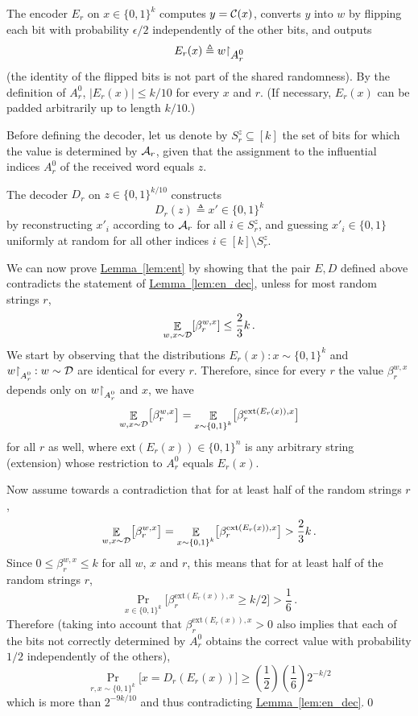 \documentclass[10pt]{article}
\theoremstyle{definition}
\numberwithin{equation}{section}
\newcommand{\expref}[2]{\texorpdfstring{\hyperref[#2]{#1~\ref{#2}}}{#1~\ref{#2}}}
\DeclareMathOperator*{\Exp}{{\mathbb{E}}}
\newcommand{\ALG}{{\cal A}}
\newcommand{\DD}{{\cal D}}
\newcommand{\CC}{{\cal C}}
\newcommand{\zo}{{\{0,1\}}}
\newcommand{\ext}{{\mathrm{ext}}}
\newcommand{\rst}[1]{\ensuremath{{\mathbin\upharpoonright}%
\raise-.9ex\hbox{$#1$}}}
\newcommand{\rstsmall}[1]{\ensuremath{{\mathbin\upharpoonright}%
\raise-.9ex\hbox{\scriptsize $#1$}}}
\begin{document}
The encoder $E_r$ on $x \in \zo^k$ computes $y = \CC(x)$, converts $y$
into $w$ by flipping each bit with probability $\epsilon/2$
independently of the other bits, and outputs
\[
E_r(x) \triangleq w\rst{A_r^0}
\]
(the identity of the flipped bits is not part of the shared randomness). By the definition of $A_r^0$, $|E_r(x)| \leq k/10$ for every $x$ and $r$. (If necessary, $E_r(x)$ can be padded arbitrarily up to length $k/10$.)

Before defining the decoder, let us denote by $S^z_r \subseteq [k]$ the set of bits for which the value is determined by $\ALG_r$, given that the assignment to the influential indices $A_r^0$ of the received word equals $z$.

The decoder $D_r$ on $z \in \zo^{k/10}$ constructs
\[
D_r(z) \triangleq x' \in \zo^k
\]
by reconstructing $x'_i$ according to $\ALG_r$ for all $i \in S_r^z$, and guessing $x'_i \in \zo$ uniformly at random for all other indices $i \in [k] \setminus S_r^z$.

We can now prove \expref{Lemma}{lem:ent} by showing that the pair
$E,D$ defined above contradicts the statement of
\expref{Lemma}{lem:en_dec}, unless for most random strings $r$,
\[
\Exp_{w,x \sim \DD} [ \beta_r^{w,x} ] \leq \frac{2}{3}k\,.
\]
We start by observing that the distributions $E_r(x):x \sim \zo^k$ and
$w\rstsmall{A_r^0}:w \sim \DD$ are identical for every $r$. Therefore,
since for every $r$ the value $\beta_r^{w,x}$ depends only on
$w\rstsmall{A_r^0}$ and $x$, we have
\[
\Exp_{w,x \sim \DD} \bigl[ \beta_r^{w,x} \bigr] =  \Exp_{x \sim \zo^k}
\bigl[ \beta_r^{\ext(E_r(x)),x}\bigr]
\]
for all $r$ as well, where $\ext(E_r(x)) \in \zo^n$ is any arbitrary  string (extension) whose restriction to $A_r^0$ equals $E_r(x)$.

Now assume towards a contradiction that for at least half of the
random strings $r$, \[
\Exp_{w,x \sim \DD} \bigl[ \beta_r^{w,x} \bigr]  = \Exp_{x \sim \zo^k}
\bigl[ \beta_r^{\ext(E_r(x)),x}\bigr] > \frac{2}{3}k\,.
\]
Since $0 \leq \beta_r^{w,x} \leq k$ for all $w$, $x$ and $r$, this
means that for at least half of the random strings $r$, 
\[
\Pr_{x \in \zo^k}\bigl[\beta_r^{\ext(E_r(x)),x} \geq k/2\bigr] >\frac{1}{6}\,.
\]
Therefore (taking into account that $\beta_r^{\ext(E_r(x)),x}>0$ also
implies that each of the bits not correctly determined by $A_r^0$
obtains the correct value with probability $1/2$ independently of
the others), 
\[
\Pr_{r,x \sim \zo^k}\bigl[x = D_r(E_r(x))\bigr] \geq
\left(\frac{1}{2}\right)\left(\frac{1}{6}\right) 2^{-k/2}
\]
which is more than $2^{-9k/10}$ and thus contradicting \expref{Lemma}{lem:en_dec}.\hfill\qed
\end{document}
